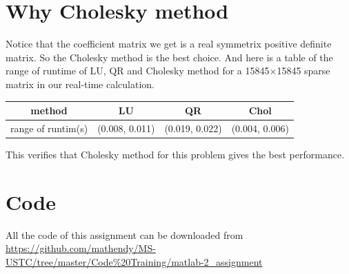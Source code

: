 \documentclass[12pt]{article}
\begin{document}
\section{Why Cholesky method}
Notice that the coefficient matrix we get is a real symmetrix positive definite matrix. So the Cholesky method is the best choice. And here is a table of the range of runtime of LU, QR and Cholesky method for a 15845$\times$15845 sparse matrix in our real-time calculation.
\begin{table}[htb]
    \centering
    \begin{tabular}{|c|c|c|c|}
        \hline
        method             & LU             & QR             & Chol           \\
        \hline
        range of runtim(s) & (0.008, 0.011) & (0.019, 0.022) & (0.004, 0.006) \\
        \hline
    \end{tabular}
\end{table}

This verifies that Cholesky method for this problem gives the best performance.

\newpage
\appendix
\section{Code}
All the code of this assignment can be downloaded from \url{https://github.com/mathendy/MS-USTC/tree/master/Code%20Training/matlab-2_assignment}
\end{document}
